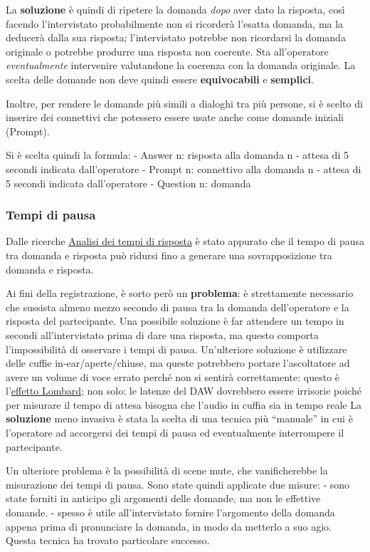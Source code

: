 \documentclass[
]{article}
\begin{document}
La \textbf{soluzione} è quindi di ripetere la domanda \emph{dopo} aver dato la risposta, così facendo l'intervistato probabilmente non si ricorderà l'esatta domanda, ma la deducerà dalla sua risposta; l'intervistato potrebbe non ricordarsi la domanda originale o potrebbe produrre una risposta non coerente. Sta all'operatore \emph{eventualmente} intervenire valutandone la coerenza con la domanda originale. La scelta delle domande non deve quindi essere \textbf{equivocabili} e \textbf{semplici}.

Inoltre, per rendere le domande più simili a dialoghi tra più persone, si è scelto di inserire dei connettivi che potessero essere usate anche come domande iniziali (Prompt).

Si è scelta quindi la formula: - Answer n: risposta alla domanda n - attesa di 5 secondi indicata dall'operatore - Prompt n: connettivo alla domanda n - attesa di 5 secondi indicata dall'operatore - Question n: domanda

\subsubsection{Tempi di pausa}\label{tempi-di-pausa}

Dalle ricerche \hyperref[analisi-dei-tempi-di-risposta]{Analisi dei tempi di risposta} è stato appurato che il tempo di pausa tra domanda e risposta può ridursi fino a generare una sovrapposizione tra domanda e risposta.

Ai fini della registrazione, è sorto però un \textbf{problema}: è strettamente necessario che sussista almeno mezzo secondo di pausa tra la domanda dell'operatore e la risposta del partecipante. Una possibile soluzione è far attendere un tempo in secondi all'intervistato prima di dare una risposta, ma questo comporta l'impossibilità di osservare i tempi di pausa. Un'ulteriore soluzione è utilizzare delle cuffie in-ear/aperte/chiuse, ma queste potrebbero portare l'ascoltatore ad avere un volume di voce errato perché non si sentirà correttamente: questo è l'\hyperref[Effetto-Lombard-e-la-cuffia-nel-doppiaggio-per-una-voce-naturale]{effetto Lombard}; non solo: le latenze del DAW dovrebbero essere irrisorie poiché per misurare il tempo di attesa bisogna che l'audio in cuffia sia in tempo reale La \textbf{soluzione} meno invasiva è stata la scelta di una tecnica più ``manuale'' in cui è l'operatore ad accorgersi dei tempi di pausa ed eventualmente interrompere il partecipante.

Un ulteriore problema è la possibilità di scene mute, che vanificherebbe la misurazione dei tempi di pausa. Sono state quindi applicate due misure: - sono state forniti in anticipo gli argomenti delle domande, ma non le effettive domande. - spesso è utile all'intervistato fornire l'argomento della domanda appena prima di pronunciare la domanda, in modo da metterlo a suo agio. Questa tecnica ha trovato particolare successo.
\end{document}
